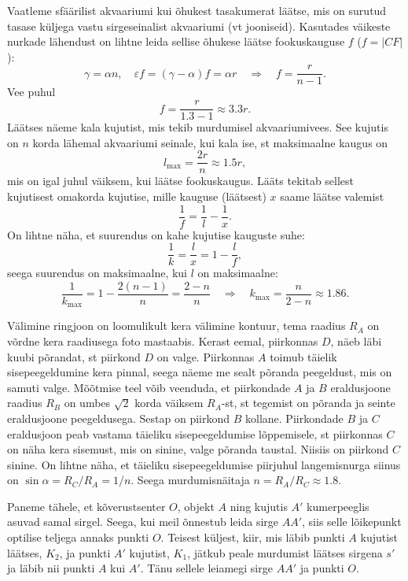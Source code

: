 \documentclass[10pt]{article}
\begin{document}
{Vaatleme sfäärilist akvaariumi kui õhukest tasakumerat läätse, mis on surutud tasase küljega vastu sirgeseinalist akvaariumi (vt jooniseid). Kasutades väikeste nurkade lähendust on lihtne leida sellise õhukese läätse fookuskauguse $f$ ($f = |CF|$):
\[
\gamma=\alpha n, \quad \varepsilon f=(\gamma-\alpha) f=\alpha r \quad \Rightarrow \quad f=\frac{r}{n-1}.
\]
Vee puhul
\[
f=\frac{r}{\num{1,3}-\num{1}} \approx \num{3,3} r.
\]
Läätses näeme kala kujutist, mis tekib murdumisel akvaariumivees. See kujutis on $n$ korda lähemal akvaariumi seinale, kui kala ise, st maksimaalne kaugus on
\[
l_{\max }=\frac{2 r}{n} \approx \num{1,5} r,
\]
mis on igal juhul väiksem, kui läätse fookuskaugus. Lääts tekitab sellest kujutisest omakorda kujutise, mille kauguse (läätsest) $x$ saame läätse valemist
\[
\frac{1}{f}=\frac{1}{l}-\frac{1}{x}.
\]
On lihtne näha, et suurendus on kahe kujutise kauguste suhe:
\[
\frac{1}{k}=\frac{l}{x}=1-\frac{l}{f},
\]
seega suurendus on maksimaalne, kui $l$ on maksimaalne:
\[
\frac{1}{k_{\max }}=1-\frac{2(n-1)}{n}=\frac{2-n}{n} \quad\Rightarrow\quad k_{\max }=\frac{n}{2-n} \approx \num{1,86}.
\]
\probend
\bigskip


\solu
Välimine ringjoon on loomulikult kera välimine kontuur, tema raadius $R_A$ on võrdne kera raadiusega foto mastaabis. Kerast eemal, piirkonnas $D$, näeb läbi kuubi põrandat, st piirkond $D$ on valge. Piirkonnas $A$ toimub täielik sisepeegeldumine kera pinnal, seega näeme me sealt põranda peegeldust, mis on samuti valge. Mõõtmise teel võib veenduda, et piirkondade $A$ ja $B$ eraldusjoone raadius $R_B$ on umbes $\sqrt 2$ korda väiksem $R_A$-st, st tegemist on põranda ja seinte eraldusjoone peegeldusega. Sestap on piirkond $B$ kollane. Piirkondade $B$ ja $C$ eraldusjoon peab vastama täieliku sisepeegeldumise lõppemisele, st piirkonnas $C$ on näha kera sisemust, mis on sinine, valge põranda taustal. Niisiis on piirkond $C$ sinine. On lihtne näha, et täieliku sisepeegeldumise piirjuhul langemisnurga siinus on $\sin \alpha = R_C/R_A = 1/n$. Seega murdumisnäitaja $n = R_A/R_C \approx \num{1,8}$.
\probend
\bigskip


\solu
Paneme tähele, et kõverustsenter $O$, objekt $A$ ning kujutis $A'$ kumerpeeglis asuvad samal sirgel. Seega, kui meil õnnestub leida sirge $AA'$, siis selle lõikepunkt optilise teljega annaks punkti $O$. Teisest küljest, kiir, mis läbib punkti $A$ kujutist läätses, $K_2$, ja punkti $A'$ kujutist, $K_1$, jätkub peale murdumist läätses sirgena $s'$ ja läbib nii punkti $A$ kui $A'$. Tänu sellele leiamegi sirge $AA'$ ja punkti $O$.

}
\end{document}
